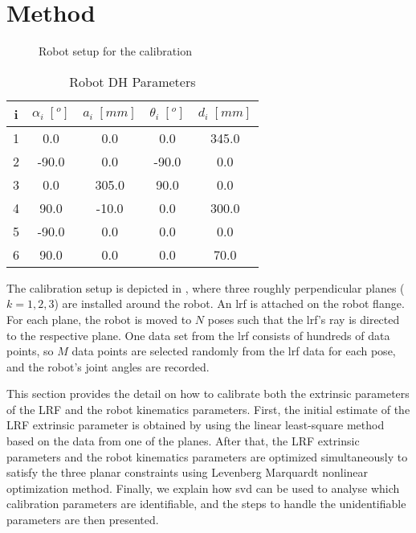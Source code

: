 \section{Method}
\label{sec:method}
\begin{figure}[t]
  \centering
  \vspace*{2mm}
  \caption{Robot setup for the calibration}
  \label{fig:robot_setup}
\end{figure}


\renewcommand{\arraystretch}{1.5}
\begin{table}[htp]
\caption{Robot DH Parameters}
\label{tab:dh_params}
\centering
\begin{tabular}{c c c c c}
\toprule
i &  \textbf{$\alpha_i \;[^o]$} & \textbf{$a_i \;[mm]$} &  \textbf{$\theta_i \;[^o]$}  & \textbf{$d_i \;[mm]$}\\
\midrule
1 & 0.0 & 0.0 & 0.0 & 345.0\\
2 & -90.0 & 0.0 & -90.0 & 0.0\\
3 & 0.0 & 305.0 & 90.0 & 0.0\\
4 & 90.0 & -10.0 & 0.0 & 300.0\\
5 & -90.0 & 0.0 & 0.0 & 0.0\\
6 & 90.0 & 0.0 & 0.0 & 70.0\\
\bottomrule
\end{tabular}
\end{table}

The calibration setup is depicted in , where three roughly perpendicular planes ($k=1,2,3$) are installed around the robot. An \ac{lrf} is attached on the robot flange. For each plane, the robot is moved to $N$ poses such that the \ac{lrf}'s ray is directed to the respective plane. One data set from the \ac{lrf} consists of hundreds of data points, so $M$ data points are selected randomly from the \ac{lrf} data for each pose, and the robot's joint angles are recorded. 

This section provides the detail on how to calibrate both the extrinsic parameters of the LRF and the robot kinematics parameters. First, the initial estimate of the LRF extrinsic parameter is obtained by using the linear least-square method based on the data from one of the planes. After that, the LRF extrinsic parameters and the robot kinematics parameters are optimized simultaneously to satisfy the three planar constraints using Levenberg Marquardt nonlinear optimization method. Finally, we explain how \ac{svd} can be used to analyse which calibration parameters are identifiable, and the steps to handle the unidentifiable parameters are then presented. 
